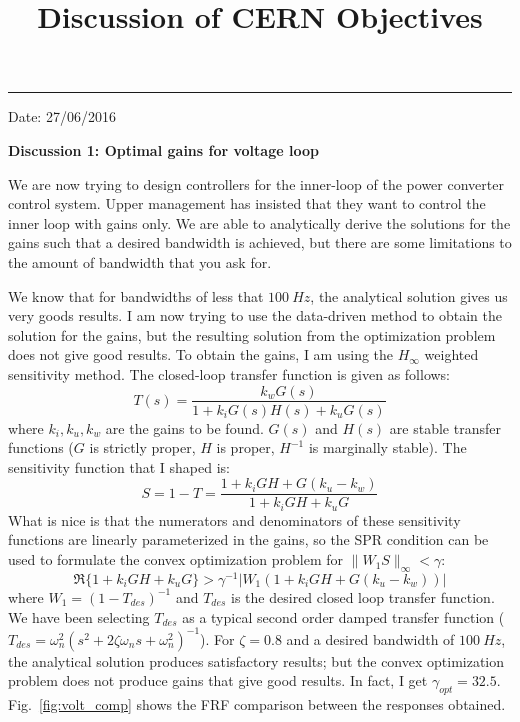 \documentclass[12pt]{article}
\title{\LARGE \bf Discussion of CERN Objectives}
\begin{document}
\maketitle

\hrule
\begin{flushright}
Date: 27/06/2016
\end{flushright}
\textbf{Discussion 1: Optimal gains for voltage loop}

We are now trying to design controllers for the inner-loop of the power converter control system. Upper management has insisted that they want to control the inner loop with gains only. We are able to analytically derive the solutions for the gains such that a desired bandwidth is achieved, but there are some limitations to the amount of bandwidth that you ask for. 

We know that for bandwidths of less that $100 \: Hz$, the analytical solution gives us very goods results. I am now trying to use the data-driven method to obtain the solution for the gains, but the resulting solution from the optimization problem does not give good results. To obtain the gains, I am using the $H_\infty$ weighted sensitivity method. The closed-loop transfer function is given as follows:
\begin{equation}
T(s) = \frac{k_wG(s)}{1+k_iG(s)H(s) + k_uG(s)}
\end{equation} 
where $k_i, k_u, k_w$ are the gains to be found. $G(s)$ and $H(s)$ are stable transfer functions ($G$ is strictly proper, $H$ is proper, $H^{-1}$ is marginally stable). The sensitivity function that I shaped is:
\begin{equation}
S = 1-T =\frac{1+k_iGH+G(k_u-k_w)}{1+k_iGH+k_uG} 
\end{equation}
What is nice is that the numerators and denominators of these sensitivity functions are linearly parameterized in the gains, so the SPR condition can be used to formulate the convex optimization problem for $\| W_1S\|_\infty < \gamma$:
\begin{equation}
\Re \{ 1+k_iGH+k_uG\} > \gamma^{-1} |W_1(1+k_iGH+G(k_u-k_w))| 
\end{equation}
where $W_1 = (1-T_{des})^{-1}$ and $T_{des}$ is the desired closed loop transfer function. We have been selecting $T_{des}$ as a typical second order damped transfer function ($T_{des} = \omega_n^2(s^2+2\zeta\omega_n s + \omega_n^2 )^{-1}$). For $\zeta = 0.8$ and a desired bandwidth of $100 \: Hz$, the analytical solution produces satisfactory results; but the convex optimization problem does not produce gains that give good results. In fact, I get $\gamma_{opt} = 32.5$. Fig.~\ref{fig:volt_comp} shows the FRF comparison between the responses obtained.
\end{document}

